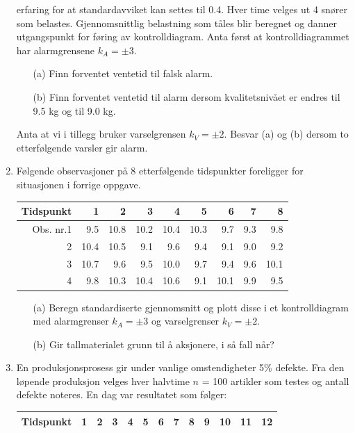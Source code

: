 \begin{enumerate}
erfaring for at standardavviket kan settes til 0.4.  Hver time velges
ut 4 snører som belastes.  Gjennomsnittlig belastning som tåles 
blir beregnet og danner utgangspunkt for føring av kontrolldiagram.
Anta først at kontrolldiagrammet har alarmgrensene $k_A = \pm 3$. 
\begin{itemize}
\item[(a)] Finn forventet ventetid til falsk alarm. 
\item[(b)] Finn forventet ventetid til alarm dersom kvalitetsnivået er
    endres til 9.5 kg og til 9.0 kg.
\end{itemize}
Anta at vi i tillegg bruker varselgrensen $k_V = \pm 2$.  Besvar (a) og
(b) dersom to etterfølgende varsler gir alarm.
\item
Følgende observasjoner på 8 etterfølgende tidspunkter 
foreligger for situa\-sjonen i forrige oppgave.
\begin{center}
\begin{tabular}{|r|rrrrrrrr|} \hline
Tidspunkt &  1   &   2   &   3   &   4   &   5   &   6   &   7  &   8 \\ \hline
Obs. nr.1 &  9.5 & 10.8  & 10.2  & 10.4  & 10.3  &  9.7  &  9.3 &  9.8 \\
        2 & 10.4 & 10.5  &  9.1  &  9.6  &  9.4  &  9.1  &  9.0 &  9.2 \\
        3 & 10.7 &  9.6  &  9.5  & 10.0  &  9.7  &  9.4  &  9.6 & 10.1 \\
        4 &  9.8 & 10.3  & 10.4  & 10.6  &  9.1  & 10.1  &  9.9 &  9.5 \\ \hline
\end{tabular}
\end{center}
\begin{itemize}
\item[(a)] Beregn standardiserte gjennomsnitt og plott disse i et 
kontrolldiagram med alarmgrenser $k_A = \pm 3$ og varselgrenser $k_V = \pm 2$.
\item[(b)] Gir tallmaterialet grunn til å aksjonere, i så fall når?
\end{itemize}
\item
En produksjonsprosess gir under vanlige omstendigheter 5\% defekte.  
Fra den løpende produksjon velges hver halvtime $n$ = 100 artikler
som testes og antall defekte noteres.  En dag var resultatet som følger:
\begin{center}
\begin{tabular}{l|rrrrrrrrrrrr}
Tidspunkt    & 1 & 2 & 3 & 4 & 5 & 6 & 7 & 8 & 9 & 10 & 11 & 12 \\ \hline

\end{tabular}
\end{center}
\end{enumerate}
